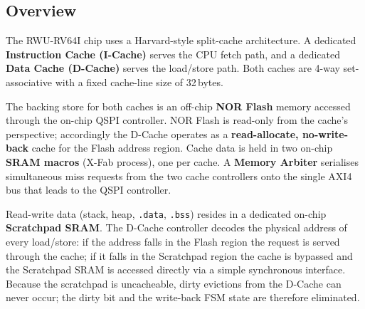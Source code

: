 
\subsection{Overview}

The RWU-RV64I chip uses a Harvard-style split-cache architecture.
A dedicated \textbf{Instruction Cache (I-Cache)} serves the CPU fetch path,
and a dedicated \textbf{Data Cache (D-Cache)} serves the load/store path.
Both caches are 4-way set-associative with a fixed cache-line size of
32\,bytes.

The backing store for both caches is an off-chip \textbf{NOR Flash} memory
accessed through the on-chip QSPI controller.
NOR Flash is read-only from the cache's perspective; accordingly the D-Cache
operates as a \textbf{read-allocate, no-write-back} cache for the Flash
address region.
Cache data is held in two on-chip \textbf{SRAM macros} (X-Fab process),
one per cache.
A \textbf{Memory Arbiter} serialises simultaneous miss requests from the two
cache controllers onto the single AXI4 bus that leads to the QSPI controller.

Read-write data (stack, heap, \texttt{.data}, \texttt{.bss}) resides in a
dedicated on-chip \textbf{Scratchpad SRAM}.
The D-Cache controller decodes the physical address of every load/store: if
the address falls in the Flash region the request is served through the cache;
if it falls in the Scratchpad region the cache is bypassed and the Scratchpad
SRAM is accessed directly via a simple synchronous interface.
Because the scratchpad is uncacheable, dirty evictions from the D-Cache
can never occur; the dirty bit and the write-back FSM state are therefore
eliminated.

